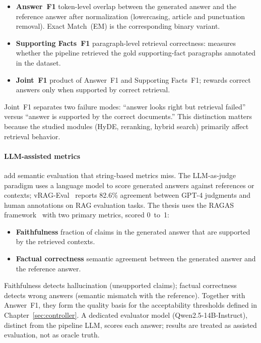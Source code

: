 \begin{itemize}
    \item \textbf{Answer~F1} token-level overlap between the generated
          answer and the reference answer after normalization (lowercasing,
          article and punctuation removal). Exact Match~(EM) is the
          corresponding binary variant.
    \item \textbf{Supporting Facts~F1} paragraph-level retrieval
          correctness: measures whether the pipeline retrieved the gold
          supporting-fact paragraphs annotated in the dataset.
    \item \textbf{Joint~F1} product of Answer~F1 and Supporting Facts~F1;
          rewards correct answers only when supported by correct retrieval.
\end{itemize}

Joint~F1 separates two failure modes: ``answer looks right but retrieval
failed'' versus ``answer is supported by the correct documents.'' This
distinction matters because the studied modules (HyDE, reranking, hybrid
search) primarily affect retrieval behavior.


\paragraph{LLM-assisted metrics} add semantic evaluation that string-based
metrics miss. The LLM-as-judge paradigm uses a language model to score
generated answers against references or contexts;
vRAG-Eval~\cite{vrageval2024} reports 82.6\% agreement between GPT-4
judgments and human annotations on RAG evaluation tasks. The thesis uses the
RAGAS framework~\cite{ragas2023} with two primary metrics, scored 0~to~1:

\begin{itemize}
    \item \textbf{Faithfulness} fraction of claims in the generated
          answer that are supported by the retrieved contexts.
    \item \textbf{Factual correctness} semantic agreement between
          the generated answer and the reference answer.
\end{itemize}

Faithfulness detects hallucination (unsupported claims); factual correctness
detects wrong answers (semantic mismatch with the reference). Together with
Answer~F1, they form the quality basis for the acceptability thresholds
defined in Chapter~\ref{sec:controller}. A dedicated evaluator model
(Qwen2.5-14B-Instruct), distinct from the pipeline LLM, scores
each answer; results are treated as assisted evaluation, not as
oracle truth.


